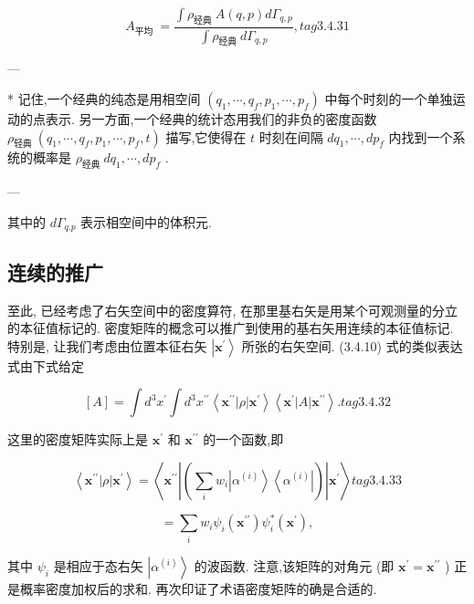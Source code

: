 $$
{A}_{\text{平均 }} = \frac{\int {\rho }_{\text{经典 }}A\left( {q, p}\right) d{\Gamma }_{q, p}}{\int {\rho }_{\text{经典 }}d{\Gamma }_{q, p}}, tag{3. 4.31}
$$

---

* 记住,一个经典的纯态是用相空间 $\left( {{q}_{1},\cdots ,{q}_{f},{p}_{1},\cdots ,{p}_{f}}\right)$ 中每个时刻的一个单独运动的点表示. 另一方面,一个经典的统计态用我们的非负的密度函数 ${\rho }_{\text{轻典 }}\left( {{q}_{1},\cdots ,{q}_{f},{p}_{1},\cdots ,{p}_{f}, t}\right)$ 描写,它使得在 $t$ 时刻在间隔 $d{q}_{1},\cdots, d{p}_{f}$ 内找到一个系统的概率是 ${\rho }_{\text{经典 }}d{q}_{1},\cdots, d{p}_{f}$ .

---

其中的 $d{\Gamma }_{q.p}$ 表示相空间中的体积元.

\subsection{连续的推广} 

至此, 已经考虑了右矢空间中的密度算符, 在那里基右矢是用某个可观测量的分立的本征值标记的. 密度矩阵的概念可以推广到使用的基右矢用连续的本征值标记. 特别是, 让我们考虑由位置本征右矢 $\left| {\mathbf{x}}^{\prime }\right\rangle$ 所张的右矢空间. (3.4.10) 式的类似表达式由下式给定

$$
\left\lbrack A\right\rbrack = \int {d}^{3}{x}^{\prime }\int {d}^{3}{x}^{\prime \prime }\left\langle {{\mathbf{x}}^{\prime \prime }\left| \rho \right| {\mathbf{x}}^{\prime }}\right\rangle \left\langle {{\mathbf{x}}^{\prime }\left| A\right| {\mathbf{x}}^{\prime \prime }}\right\rangle . tag{3. 4.32}
$$

这里的密度矩阵实际上是 ${\mathbf{x}}^{\prime }$ 和 ${\mathbf{x}}^{\prime \prime }$ 的一个函数,即

$$
\left\langle {{\mathbf{x}}^{\prime \prime }\left| \rho \right| {\mathbf{x}}^{\prime }}\right\rangle = \left\langle {{\mathbf{x}}^{\prime \prime }\left| \left( {\mathop{\sum }\limits_{i}{w}_{i}\left| {\alpha }^{\left( i\right) }\right\rangle \left\langle {\alpha }^{\left( i\right) }\right| }\right) \right| {\mathbf{x}}^{\prime }}\right\rangle tag{3. 4.33}
$$

$$
= \mathop{\sum }\limits_{i}{w}_{i}{\psi }_{i}\left( {\mathbf{x}}^{\prime \prime }\right) {\psi }_{i}^{ * }\left( {\mathbf{x}}^{\prime }\right) ,
$$

其中 ${\psi }_{i}$ 是相应于态右矢 $\left| {\alpha }^{\left( i\right) }\right\rangle$ 的波函数. 注意,该矩阵的对角元 (即 ${\mathbf{x}}^{\prime } = {\mathbf{x}}^{\prime \prime }$ ) 正是概率密度加权后的求和. 再次印证了术语密度矩阵的确是合适的.

